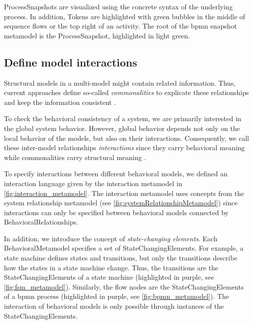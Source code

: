\documentclass{jot}
\begin{document}
\textsf{ProcessSnapshot}s are visualized using the concrete syntax of the underlying process.
In addition, \textsf{Token}s are highlighted with green bubbles in the middle of sequence flows or the top right of an activity.
The root of the \gls*{bpmn} snapshot metamodel is the \textsf{ProcessSnapshot}, highlighted in light green.

\subsection{Define model interactions}
Structural models in a multi-model might contain related information.
Thus, current approaches define so-called \emph{commonalities} to explicate these relationships and keep the information consistent \cite{stunkelComprehensiveSystemsFormal2021,klareCommonalitiesPreservingConsistency2019}.

To check the behavioral consistency of a system, we are primarily interested in the global system behavior.
However, global behavior depends not only on the local behavior of the models, but also on their interactions.
Consequently, we call these inter-model relationships \emph{interactions} since they carry behavioral meaning while commonalities carry structural meaning \cite{krauterBehavioralConsistencyHeterogeneous2021}.

To specify interactions between different behavioral models, we defined an interaction language given by the interaction metamodel in \autoref{fig:interaction_metamodel}.
The interaction metamodel uses concepts from the system relationship metamodel (see \autoref{fig:systemRelationshipMetamodel}) since interactions can only be specified between behavioral models connected by \textsf{BehavioralRelationship}s.

In addition, we introduce the concept of \emph{state-changing elements}.
Each \textsf{BehavioralMetamodel} specifies a set of \textsf{StateChangingElement}s.
For example, a state machine defines states and transitions, but only the transitions describe how the states in a state machine change.
Thus, the transitions are the \textsf{StateChangingElement}s of a state machine (highlighted in purple, see \autoref{fig:fsm_metamodel}).
Similarly, the flow nodes are the \textsf{StateChangingElement}s of a \gls*{bpmn} process (highlighted in purple, see \autoref{fig:bpmn_metamodel}).
The interaction of behavioral models is only possible through instances of the \textsf{StateChangingElement}s.
\end{document}
